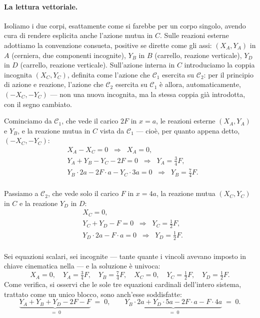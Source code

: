 


\paragraph{La lettura vettoriale.}
Isoliamo i due corpi, esattamente come si farebbe per un corpo singolo,
avendo cura di rendere esplicita anche l'azione mutua in $C$. Sulle
reazioni esterne adottiamo la convenzione consueta, positive se dirette
come gli assi: $(X_A,Y_A)$ in $A$ (cerniera, due componenti incognite),
$Y_B$ in $B$ (carrello, reazione verticale), $Y_D$ in $D$ (carrello,
reazione verticale). Sull'azione interna in $C$ introduciamo la coppia
incognita $(X_C,Y_C)$, definita come l'azione che $\mathcal{C}_1$
esercita su $\mathcal{C}_2$: per il principio di azione e reazione,
l'azione che $\mathcal{C}_2$ esercita su $\mathcal{C}_1$ è allora,
automaticamente, $(-X_C,-Y_C)$ --- non una nuova incognita, ma la stessa
coppia già introdotta, con il segno cambiato.

Cominciamo da $\mathcal{C}_1$, che vede il carico $2F$ in $x=a$, le reazioni
esterne $(X_A,Y_A)$ e $Y_B$, e la reazione mutua in $C$ vista da
$\mathcal{C}_1$ --- cioè, per quanto appena detto, $(-X_C,-Y_C)$: 
\begin{align}
& X_A - X_C = 0
	\;\;\Longrightarrow\;\; X_A=0, \label{eq:eqC1_Fx}\\
& Y_A + Y_B - Y_C - 2F = 0
\;\;\Longrightarrow\;\; Y_A = \tfrac{3}{4}F, \label{eq:eqC1_Fy}\\
	& Y_B\cdot 2a - 2F\cdot a - Y_C\cdot 3a = 0
	\;\;\Longrightarrow\;\; Y_B = \tfrac{7}{4}F. \label{eq:eqC1_MA}\\
	\end{align}

Passiamo a $\mathcal{C}_2$, che vede solo il carico $F$ in $x=4a$, la
reazione mutua $(X_C,Y_C)$ in $C$ e la reazione $Y_D$ in $D$:
\begin{align}
& X_C = 0, \label{eq:eqC2_Fx}\\
& Y_C + Y_D - F = 0
\;\;\Longrightarrow\;\; Y_C = \tfrac{1}{2}F, \label{eq:eqC2_Fy}\\
	& Y_D\cdot 2a - F\cdot a = 0
	\;\;\Longrightarrow\;\; Y_D = \tfrac{1}{2}F. \label{eq:eqC2_MC}\\
	\end{align}

Sei equazioni scalari, sei incognite --- tante quante i vincoli avevano
imposto in chiave cinematica nella  --- e la
soluzione è univoca:
\begin{equation}\label{eq:reazioni_gerber}
	X_A=0,\quad Y_A=\tfrac34 F,\quad Y_B=\tfrac74 F,\quad
	X_C=0,\quad Y_C=\tfrac12 F,\quad Y_D=\tfrac12 F.
\end{equation}
Come verifica, si osservi che le sole tre equazioni cardinali
dell'intero sistema, trattato come un unico blocco, sono anch'esse
soddisfatte:
\[
\underbrace{Y_A+Y_B+Y_D-2F-F}_{\;=\;0}\;=\;0,
\qquad
\underbrace{Y_B\cdot 2a + Y_D\cdot 5a - 2F\cdot a - F\cdot 4a}_{\;=\;0}
\;=\;0.
\]

